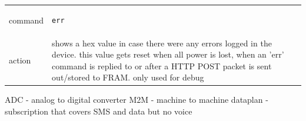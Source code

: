 \documentclass[a4paper,twoside]{refart}
\begin{document}
\begin{tabular}{ |l|p{8cm}| }
    \hline
        command & 
\begin{lstlisting}
err
\end{lstlisting} \\
        action & 
shows a hex value in case there were any errors logged in the device. this value gets reset when all power is lost, when an 'err' command is replied to or after a HTTP POST packet is sent out/stored to FRAM. only used for debug  \\ \hline
\end{tabular}


ADC - analog to digital converter
M2M - machine to machine dataplan - subscription that covers SMS and data but no voice
\end{document}
